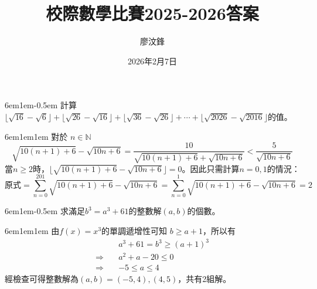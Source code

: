 \documentclass[12pt]{article}
\title{校際數學比賽2025-2026答案}
\author{廖汶鋒}
\date{2026年2月7日}
\def\pA{-0.5em}
\def\Ap{1em}
\begin{document}
\thispagestyle{fancy}  %
\maketitle

\begin{mybox}[Problem 1]{6em}{1em}{\pA}
    計算$\lfloor\sqrt{16}-\sqrt{6}\rfloor+\lfloor\sqrt{26}-\sqrt{16}\rfloor+\lfloor\sqrt{36}-\sqrt{26}\rfloor+\cdots+\lfloor\sqrt{2026}-\sqrt{2016}\rfloor$的值。
\end{mybox}
\begin{mybox}[Answer]{6em}{1em}{\Ap}
    對於 $n\in\mathbb{N}$
    $$
    \sqrt{10\left(n+1\right)+6}-\sqrt{10n+6}=\frac{10}{\sqrt{10\left(n+1\right)+6}+\sqrt{10n+6}}< \frac{5}{\sqrt{10n+6}}
    $$
    當$n\geq 2$時，$\lfloor\sqrt{10\left(n+1\right)+6}-\sqrt{10n+6}\rfloor=0$。因此只需計算$n=0,1$的情況：
    $$
    \text{原式}=\sum\limits_{n=0}^{201}{\sqrt{10\left(n+1\right)+6}-\sqrt{10n+6}}=\sum_{n=0}^{1}{\sqrt{10\left(n+1\right)+6}-\sqrt{10n+6}}=2
    $$
\end{mybox}

\begin{mybox}[Problem 2]{6em}{1em}{\pA}
    求滿足$b^3=a^3+61$的整數解$(a,b)$的個數。
\end{mybox}
\begin{mybox}[Answer]{6em}{1em}{\Ap}
    由$f\left(x\right)=x^3$的單調遞增性可知 $b\geq a+1$，所以有
    \begin{align*}
        &a^3+61=b^3\geq (a+1)^3\\
        \Rightarrow\quad &a^2+a-20\leq 0\\
        \Rightarrow\quad &-5\leq a\leq 4
    \end{align*}
    經檢查可得整數解為$(a,b)=(-5,4),(4,5)$，共有2組解。
\end{mybox}
\end{document}
